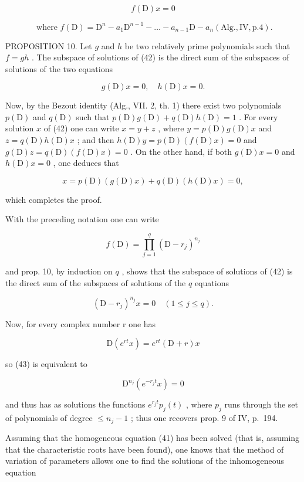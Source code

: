 \[
f (\mathrm{D}) x = 0\tag{42}
\]

\[
\text { where } f (\mathrm{D}) = \mathrm{D} ^ {n} - a _ {1} \mathrm{D} ^ {n - 1} - \dots - a _ {n - 1} \mathrm{D} - a _ {n} (\mathrm{Alg}., \mathrm{IV}, \mathrm{p}. 4).
\]

PROPOSITION 10. Let \(g\) and \(h\) be two relatively prime polynomials such that \(f = gh\) . The subspace of solutions of (42) is the direct sum of the subspaces of solutions of the two equations

\[
g (\mathrm{D}) x = 0, \quad h (\mathrm{D}) x = 0.
\]

Now, by the Bezout identity (Alg., VII. 2, th. 1) there exist two polynomials \(p(\mathrm{D})\) and \(q(\mathrm{D})\) such that \(p(\mathrm{D})g(\mathrm{D}) + q(\mathrm{D})h(\mathrm{D}) = 1\) . For every solution \(x\) of (42) one can write \(x = y + z\) , where \(y = p(\mathrm{D})g(\mathrm{D})x\) and \(z = q(\mathrm{D})h(\mathrm{D})x\) ; and then \(h(\mathrm{D})y = p(\mathrm{D})(f(\mathrm{D})x) = 0\) and \(g(\mathrm{D})z = q(\mathrm{D})(f(\mathrm{D})x) = 0\) . On the other hand, if both \(g(\mathrm{D})x = 0\) and \(h(\mathrm{D})x = 0\) , one deduces that

\[
x = p (\mathrm{D}) (g (\mathrm{D}) x) + q (\mathrm{D}) (h (\mathrm{D}) x) = 0,
\]

which completes the proof.

With the preceding notation one can write

\[
f (\mathrm{D}) = \prod_ {j = 1} ^ {q} (\mathrm{D} - r _ {j}) ^ {n _ {j}}
\]

and prop. 10, by induction on \(q\) , shows that the subspace of solutions of (42) is the direct sum of the subspaces of solutions of the \(q\) equations

\[
(\mathrm{D} - r _ {j}) ^ {n _ {j}} x = 0 \quad (1 \leqslant j \leqslant q).\tag{43}
\]

Now, for every complex number r one has

\[
\mathrm{D} (e ^ {r t} x) = e ^ {r t} (\mathrm{D} + r) x\tag{44}
\]

so (43) is equivalent to

\[
\mathrm{D} ^ {n _ {j}} \left(e ^ {- r _ {j} t} x\right) = 0
\]

and thus has as solutions the functions \(e^{r_{j}t} p_{j}(t)\) , where \(p_{j}\) runs through the set of polynomials of degree \(\leqslant n_{j}-1\) ; thus one recovers prop. 9 of IV, p.~194.

Assuming that the homogeneous equation (41) has been solved (that is, assuming that the characteristic roots have been found), one knows that the method of variation of parameters allows one to find the solutions of the inhomogeneous equation

